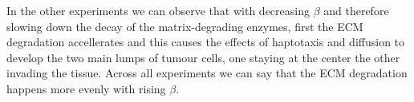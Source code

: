 In the other experiments we can observe that with decreasing $\beta$ and therefore slowing down the decay of the matrix-degrading enzymes, first the ECM degradation accellerates and this causes the effects of haptotaxis and diffusion to develop the two main lumps of tumour cells, one staying at the center the other invading the tissue.
Across all experiments we can say that the ECM degradation happens more evenly with rising $\beta$.

